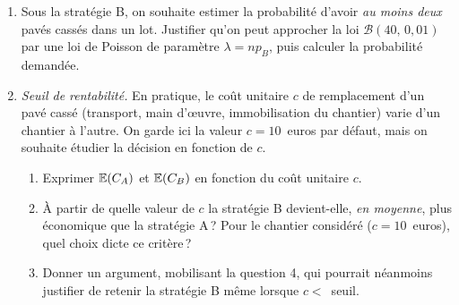 \begin{enumerate}
  \item Sous la stratégie B, on souhaite estimer la probabilité d'avoir \emph{au moins deux} pavés cassés dans un lot. Justifier qu'on peut approcher la loi $\mathcal{B}(40,\,0{,}01)$ par une loi de Poisson de paramètre $\lambda = n p_B$, puis calculer la probabilité demandée.

  \item \emph{Seuil de rentabilité.} En pratique, le coût unitaire $c$ de remplacement d'un pavé cassé (transport, main d'\oe uvre, immobilisation du chantier) varie d'un chantier à l'autre. On garde ici la valeur $c = 10$~euros par défaut, mais on souhaite étudier la décision en fonction de $c$.
  \begin{enumerate}
    \item[(a)] Exprimer $\mathbb{E}(C_A)$ et $\mathbb{E}(C_B)$ en fonction du coût unitaire $c$.
    \item[(b)] À partir de quelle valeur de $c$ la stratégie B devient-elle, \emph{en moyenne}, plus économique que la stratégie A\,? Pour le chantier considéré ($c = 10$~euros), quel choix dicte ce critère\,?
    \item[(c)] Donner un argument, mobilisant la question 4, qui pourrait néanmoins justifier de retenir la stratégie B même lorsque $c < $~seuil.
  \end{enumerate}
\end{enumerate}
